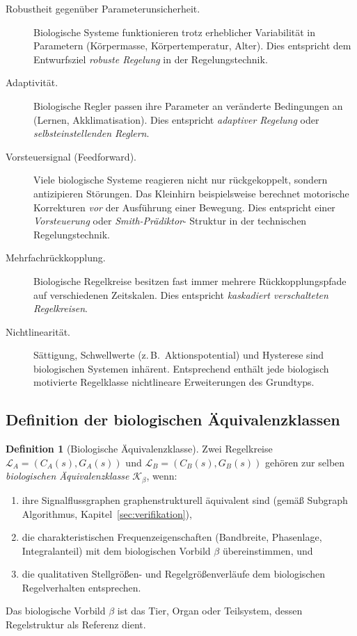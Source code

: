 \documentclass[a4paper,12pt]{article}
\theoremstyle{definition}
\newtheorem{definition}{Definition}
\begin{document}
\begin{description}
	\item[Robustheit gegenüber Parameterunsicherheit.]
	Biologische Systeme funktionieren trotz erheblicher Variabilität in
	Parametern (Körpermasse, Körpertemperatur, Alter). Dies entspricht
	dem Entwurfsziel \emph{robuste Regelung} in der Regelungstechnik.
	
	\item[Adaptivität.]
	Biologische Regler passen ihre Parameter an veränderte Bedingungen an
	(Lernen, Akklimatisation). Dies entspricht \emph{adaptiver Regelung}
	oder \emph{selbsteinstellenden Reglern}.
	
	\item[Vorsteuersignal (Feedforward).]
	Viele biologische Systeme reagieren nicht nur rückge\-koppelt, sondern
	antizipieren Störungen. Das Kleinhirn beispielsweise berechnet
	motorische Korrekturen \emph{vor} der Ausführung einer Bewegung.
	Dies entspricht einer \emph{Vorsteuerung} oder \emph{Smith-Prädiktor}-
	Struktur in der technischen Regelungstechnik.
	
	\item[Mehrfachrückkopplung.]
	Biologische Regelkreise besitzen fast immer mehrere Rückkopp\-lungspfade
	auf verschiedenen Zeitskalen. Dies entspricht \emph{kaskadiert
		verschalteten Regelkreisen}.
	
	\item[Nichtlinearität.]
	Sättigung, Schwellwerte (z.\,B.\ Aktionspotential) und Hysterese sind
	biologischen Systemen inhärent. Entsprechend enthält jede biologisch
	motivierte Regelklasse nichtlineare Erweiterungen des Grundtyps.
\end{description}

\subsection{Definition der biologischen Äquivalenzklassen}
\label{subsec:bio_klassen_definition}

\begin{definition}[Biologische Äquivalenzklasse]
	Zwei Regelkreise $\mathcal{L}_A = (C_A(s), G_A(s))$ und
	$\mathcal{L}_B = (C_B(s), G_B(s))$ gehören zur selben \emph{biologischen
		Äquivalenzklasse} $\mathcal{K}_\beta$, wenn:
	\begin{enumerate}
		\item ihre Signalflussgraphen graphenstrukturell äquivalent sind (gemäß
		Subgraph Algorithmus, Kapitel~\ref{sec:verifikation}),
		\item die charakteristischen Frequenzeigenschaften (Bandbreite, Phasenlage,
		Integralanteil) mit dem biologischen Vorbild $\beta$ übereinstimmen, und
		\item die qualitativen Stellgrößen- und Regelgrößenverläufe dem biologischen
		Regelverhalten entsprechen.
	\end{enumerate}
	Das biologische Vorbild $\beta$ ist das Tier, Organ oder Teilsystem, dessen
	Regelstruktur als Referenz dient.
\end{definition}
\end{document}
